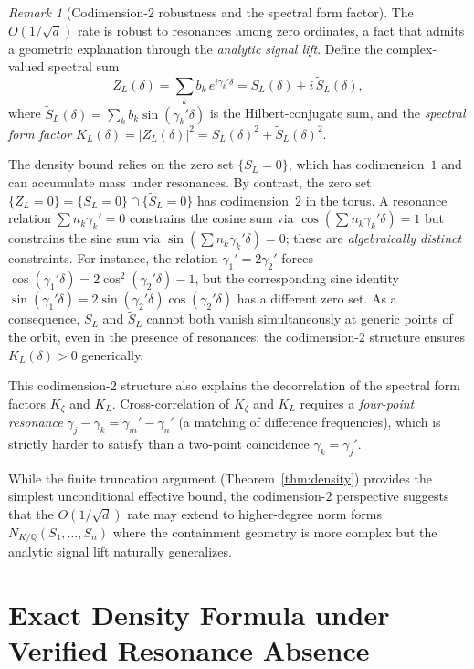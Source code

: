 \documentclass[12pt,reqno]{amsart}
\theoremstyle{plain}
\theoremstyle{definition}
\theoremstyle{remark}
\newtheorem{remark}[theorem]{Remark}
\newcommand{\Q}{\mathbb{Q}}
\begin{document}
\begin{remark}[Codimension-$2$ robustness and the spectral form factor]\label{rem:codim2}
The $O(1/\sqrt{d})$ rate is robust to resonances among zero ordinates, a fact that admits a geometric explanation through the \emph{analytic signal lift}.  Define the complex-valued spectral sum
\[
  Z_L(\delta) = \sum_k b_k\, e^{i\gamma_k'\delta} = S_L(\delta) + i\,\widetilde{S}_L(\delta),
\]
where $\widetilde{S}_L(\delta) = \sum_k b_k \sin(\gamma_k'\delta)$ is the Hilbert-conjugate sum, and the \emph{spectral form factor} $K_L(\delta) = |Z_L(\delta)|^2 = S_L(\delta)^2 + \widetilde{S}_L(\delta)^2$.

The density bound relies on the zero set $\{S_L = 0\}$, which has codimension~$1$ and can accumulate mass under resonances.  By contrast, the zero set $\{Z_L = 0\} = \{S_L = 0\} \cap \{\widetilde{S}_L = 0\}$ has codimension~$2$ in the torus.  A resonance relation $\sum n_k \gamma_k' = 0$ constrains the cosine sum via $\cos(\sum n_k \gamma_k' \delta) = 1$ but constrains the sine sum via $\sin(\sum n_k \gamma_k' \delta) = 0$; these are \emph{algebraically distinct} constraints.  For instance, the relation $\gamma_1' = 2\gamma_2'$ forces $\cos(\gamma_1'\delta) = 2\cos^2(\gamma_2'\delta) - 1$, but the corresponding sine identity $\sin(\gamma_1'\delta) = 2\sin(\gamma_2'\delta)\cos(\gamma_2'\delta)$ has a different zero set.  As a consequence, $S_L$ and $\widetilde{S}_L$ cannot both vanish simultaneously at generic points of the orbit, even in the presence of resonances: the codimension-$2$ structure ensures $K_L(\delta) > 0$ generically.

This codimension-$2$ structure also explains the decorrelation of the spectral form factors $K_\zeta$ and $K_L$.  Cross-correlation of $K_\zeta$ and $K_L$ requires a \emph{four-point resonance} $\gamma_j - \gamma_k = \gamma_m' - \gamma_n'$ (a matching of difference frequencies), which is strictly harder to satisfy than a two-point coincidence $\gamma_k = \gamma_j'$.

While the finite truncation argument (Theorem~\ref{thm:density}) provides the simplest unconditional effective bound, the codimension-$2$ perspective suggests that the $O(1/\sqrt{d})$ rate may extend to higher-degree norm forms $N_{K/\Q}(S_1, \ldots, S_n)$ where the containment geometry is more complex but the analytic signal lift naturally generalizes.
\end{remark}


\section{Exact Density Formula under Verified Resonance Absence}\label{sec:exact}
\end{document}
